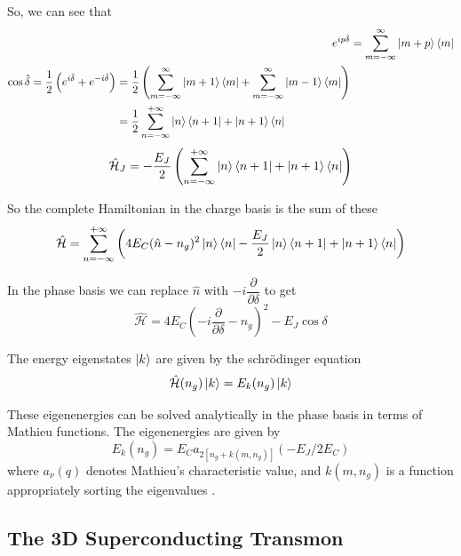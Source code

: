 So, we can see that
\begin{align}
e^{ip\hat{\delta}}&=\sum_{m=-\infty}^\infty \ket{m+p}\bra{m}\\
\begin{split}
\cos\hat{\delta}=\frac{1}{2}\left(e^{i\hat{\delta}}+e^{-i\hat{\delta}}\right)&=\frac{1}{2}\left(\sum_{m=-\infty}^\infty \ket{m+1}\bra{m}+\sum_{m=-\infty}^\infty \ket{m-1}\bra{m}\right)\\
&=\frac{1}{2}\sum_{n=-\infty}^{+\infty}\ket{n}\bra{n+1}+\ket{n+1}\bra{n}
\end{split}
\end{align}
\begin{equation}
\hat{\mathcal{H}}_J=-\frac{E_J}{2}\left(\sum_{n=-\infty}^{+\infty}\ket{n}\bra{n+1}+\ket{n+1}\bra{n}\right)
\end{equation} 

So the complete Hamiltonian in the charge basis is the sum of these
\begin{equation}
\hat{\mathcal{H}}=\sum_{n=-\infty}^{+\infty}\left(4E_C(\hat{n}-n_g)^2\ket{n}\bra{n}-\frac{E_J}{2}\ket{n}\bra{n+1}+\ket{n+1}\bra{n}\right)
\label{eqn:charge basis ham}
\end{equation}

In the phase basis we can replace $\hat{n}$ with $-i\dfrac{\partial}{\partial\delta}$ to get
\begin{equation}
\hat{\mathcal{H}}=4E_C\left(-i\frac{\partial}{\partial\delta}-n_g\right)^2-E_J\cos\delta
\end{equation}

The energy eigenstates $\ket{k}$ are given by the schr\"{o}dinger equation
\begin{equation}
\hat{\mathcal{H}}(n_g)\ket{k}=E_k(n_g)\ket{k}
\end{equation}

These eigenenergies can be solved analytically in the phase basis in terms of Mathieu functions. The eigenenergies are given by
\begin{equation}
E_k(n_g)=E_Ca_{2[n_g+k(m,n_g)]}(-E_J/2E_C)
\end{equation}
where $a_\nu(q)$ denotes Mathieu’s characteristic value, and $k(m,n_g)$ is a function appropriately sorting the eigenvalues \cite{Koch2007a}.

\subsection{The 3D Superconducting Transmon}


